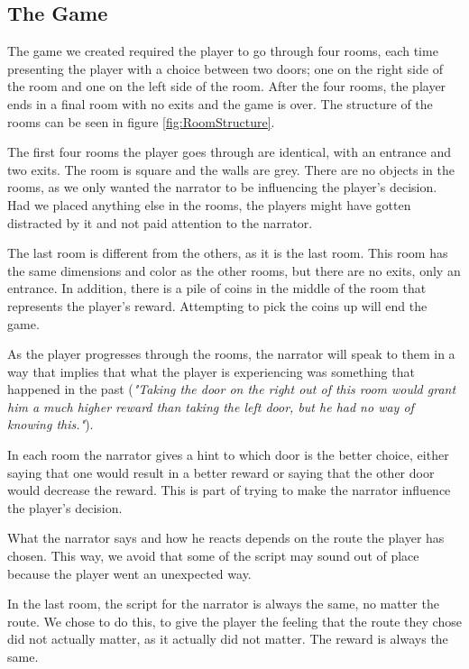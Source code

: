 \subsection{The Game}
\label{Method_Game}

The game we created required the player to go through four rooms, each time presenting the player with a choice between two doors; one on the right side of the room and one on the left side of the room. After the four rooms, the player ends in a final room with no exits and the game is over. The structure of the rooms can be seen in figure \ref{fig:RoomStructure}.


The first four rooms the player goes through are identical, with an entrance and two exits. The room is square and the walls are grey. There are no objects in the rooms, as we only wanted the narrator to be influencing the player's decision. Had we placed anything else in the rooms, the players might have gotten distracted by it and not paid attention to the narrator.

The last room is different from the others, as it is the last room. This room has the same dimensions and color as the other rooms, but there are no exits, only an entrance. In addition, there is a pile of coins in the middle of the room that represents the player's reward. Attempting to pick the coins up will end the game.

As the player progresses through the rooms, the narrator will speak to them in a way that implies that what the player is experiencing was something that happened in the past (\textit{"Taking the door on the right out of this room would grant him a much higher reward than taking the left door, but he had no way of knowing this."}).

In each room the narrator gives a hint to which door is the better choice, either saying that one would result in a better reward or saying that the other door would decrease the reward. This is part of trying to make the narrator influence the player's decision.

What the narrator says and how he reacts depends on the route the player has chosen. This way, we avoid that some of the script may sound out of place because the player went an unexpected way.

In the last room, the script for the narrator is always the same, no matter the route. We chose to do this, to give the player the feeling that the route they chose did not actually matter, as it actually did not matter. The reward is always the same.

